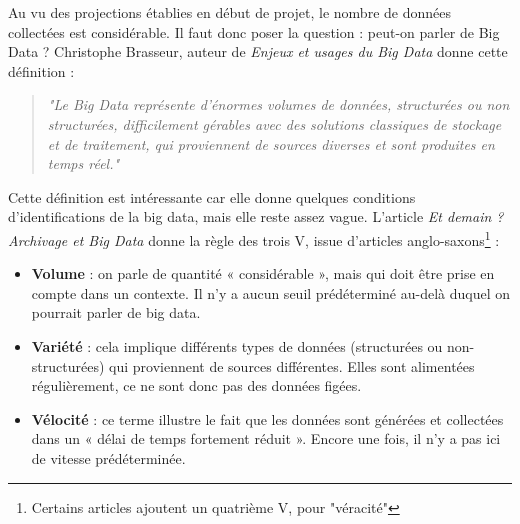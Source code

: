 Au vu des projections établies en début de projet, le nombre de données collectées est considérable. Il faut donc poser la question : peut-on parler de Big Data ? Christophe Brasseur, auteur de \textit{Enjeux et usages du Big Data} \cite{brasseurEnjeuxUsagesBig2016} donne cette définition : 
    \begin{quote}
    \textit{"Le Big Data représente d’énormes volumes de données, structurées ou non structurées, difficilement gérables avec des solutions classiques de stockage et de traitement, qui proviennent de sources diverses et sont produites en temps réel."}
    \end{quote}
Cette définition est intéressante car elle donne quelques conditions d’identifications de la big data, mais elle reste assez vague. L’article \textit{Et demain ? Archivage et Big Data} \cite{charaudeauDemainArchivageBig2015}donne la règle des trois V, issue d’articles anglo-saxons\footnote{Certains articles ajoutent un quatrième V, pour "véracité"} :

    \begin{itemize}[label=\textbullet] %
    \item \textbf{Volume} : on parle de quantité « considérable », mais qui doit être prise en compte dans un contexte. Il n’y a aucun seuil prédéterminé au-delà duquel on pourrait parler de big data.
    \item \textbf{Variété} : cela implique différents types de données (structurées ou non-structurées) qui proviennent de sources différentes. Elles sont alimentées régulièrement, ce ne sont donc pas des données figées.
    \item \textbf{Vélocité} : ce terme illustre le fait que les données sont générées et collectées dans un « délai de temps fortement réduit ». Encore une fois, il n’y a pas ici de vitesse prédéterminée.
\end{itemize}

